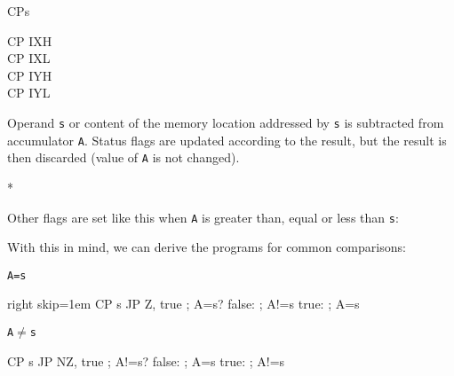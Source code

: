 \begin{basedescript}{
	\desclabelstyle{\multilinelabel}
	\desclabelwidth{3cm}}
\begin{DetailItem}{CP}{s}
\begin{DetailVariants}[4]
			\columnbreak
			CP IXH\UNDOC\\
			CP IXL\UNDOC\\
			CP IYH\UNDOC\\
			CP IYL\UNDOC
		\end{DetailVariants}

		Operand {\tt s} or content of the memory location addressed by {\tt s} is subtracted from accumulator {\tt A}. Status flags are updated according to the result, but the result is then discarded (value of {\tt A} is not changed).

		\begin{DetailEffects}[v]
			\FlagsCPr
		\end{DetailEffects}

		\begin{DetailEffectsFlags}
			\DetailFlagHF{\DetailFlagResultHalfBorrow}*
		\end{DetailEffectsFlags}

		Other flags are set like this when {\tt A} is greater than, equal or less than {\tt s}:

		\begin{DetailEffects}[v][]
		\end{DetailEffects}

		With this in mind, we can derive the programs for common comparisons:

		\newcommand{\CPExampleTitle}[1]{{\tt #1}\vspace{-1.5ex}}

		\begin{multicols}{2}
			\CPExampleTitle{A=s}
			\begin{tcblisting}{right skip=1em}
	CP s
	JP Z, true ; A=s?
false: ; A!=s
true:   ; A=s
			\end{tcblisting}

			\CPExampleTitle{A$\neq$s}
			\begin{tcblisting}{}
	CP s
	JP NZ, true ; A!=s?
false: ; A=s
true:   ; A!=s
			\end{tcblisting}
		\end{multicols}


\end{DetailItem}
\end{basedescript}
